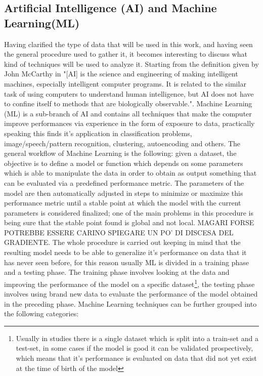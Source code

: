 \subsection{Artificial Intelligence (AI) and Machine Learning(ML)}
Having clarified the type of data that will be used in this work, and having seen the general procedure used to gather it, it becomes interesting to discuss what kind of techniques will be used to analyze it. 
Starting from the definition given by John McCarthy in \cite{AI_def} "[AI] is the science and engineering of making intelligent machines, especially intelligent computer programs. It is related to the similar task of using computers to understand human intelligence, but AI does not have to confine itself to methods that are biologically observable.". Machine Learning (ML) is a sub-branch of AI and contains all techniques that make the computer improve performances via experience in the form of exposure to data, practically speaking this finds it's application in classification problems, image/speech/pattern recognition, clustering, autoencoding and others. The general workflow of Machine Learning is the following: given a dataset, the objective is to define a model or function  which depends on some parameters which is able to manipulate the data in order to obtain as output something that can be evaluated via a predefined performance metric. The parameters of the model are then automatically adjusted in steps to minimize or maximize this performance metric until a stable point at which the model with the current parameters is considered finalized; one of the main problems in this procedure is being sure that the stable point found is global and not local. MAGARI FORSE POTREBBE ESSERE CARINO SPIEGARE UN PO' DI DISCESA DEL GRADIENTE. The whole procedure is carried out keeping in mind that the resulting model needs to be able to generalize it's performance on data that it has never seen before, for this reason usually ML is divided in a training phase and a testing phase. The training phase involves looking at the data and improving the performance of the model on a specific dataset\footnote{Usually in studies there is a single dataset which is split into a train-set and a test-set, in some cases if the model is good it can be validated prospectively, which means that it's performance is evaluated on data that did not yet exist at the time of birth of the model}, the testing phase involves using brand new data to evaluate the performance of the model obtained in the preceding phase. Machine Learning techniques can be further grouped into the following categories:

